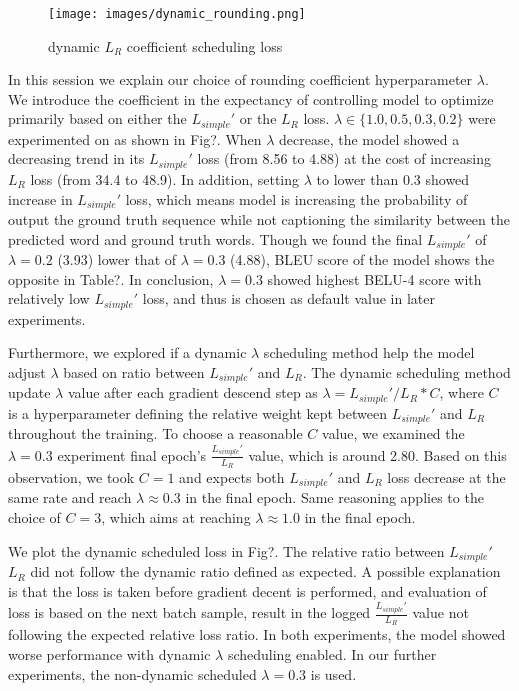 \documentclass{article}
\begin{document}
\begin{figure}
  \centering
  \texttt{[image: images/dynamic\_rounding.png]}
  \caption{dynamic $L_R$ coefficient scheduling loss}
  \label{fig:fig2}
\end{figure}

In this session we explain our choice of rounding coefficient hyperparameter $\lambda$. We introduce the coefficient in the expectancy of controlling model to optimize primarily based on either the $L_{simple}'$ or the $L_R$ loss. $\lambda \in \{1.0, 0.5, 0.3, 0.2\}$ were experimented on as shown in Fig?. When $\lambda$ decrease, the model showed a decreasing trend in its $L_{simple}'$ loss (from 8.56 to 4.88) at the cost of increasing $L_R$ loss (from 34.4 to 48.9). In addition, setting $\lambda$ to lower than 0.3 showed increase in $L_{simple}'$ loss, which means model is increasing the probability of output the ground truth sequence while not captioning the similarity between the predicted word and ground truth words. Though we found the final $L_{simple}'$ of $\lambda = 0.2$ (3.93) lower that of $\lambda = 0.3$ (4.88), BLEU score of the model shows the opposite in Table?. In conclusion, $\lambda = 0.3$ showed highest BELU-4 score with relatively low $L_{simple}'$ loss, and thus is chosen as default value in later experiments.

Furthermore, we explored if a dynamic $\lambda$ scheduling method help the model adjust $\lambda$ based on ratio between $L_{simple}'$ and $L_R$. The dynamic scheduling method update $\lambda$ value after each gradient descend step as $\lambda = L_{simple}' / L_R * C$, where $C$ is a hyperparameter defining the relative weight kept between $L_{simple}'$ and $L_R$ throughout the training. To choose a reasonable $C$ value, we examined the $\lambda = 0.3$ experiment final epoch's $\frac{L_{simple}'}{L_R}$ value, which is around 2.80. Based on this observation, we took $C = 1$ and expects both $L_{simple}'$ and $L_R$ loss decrease at the same rate and reach $\lambda \approx 0.3$ in the final epoch. Same reasoning applies to the choice of $C = 3$, which aims at reaching $\lambda \approx 1.0$ in the final epoch. 

We plot the dynamic scheduled loss in Fig?. The relative ratio between $L_{simple}'$ $L_R$ did not follow the dynamic ratio defined as expected. A possible explanation is that the loss is taken before gradient decent is performed, and evaluation of loss is based on the next batch sample, result in the logged $\frac{L_{simple}'}{L_R}$ value not following the expected relative loss ratio. In both experiments, the model showed worse performance with dynamic $\lambda$ scheduling enabled. In our further experiments, the non-dynamic scheduled $\lambda = 0.3$ is used. 
\end{document}
